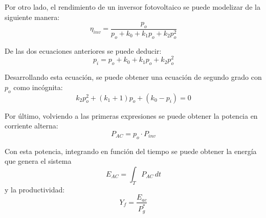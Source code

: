 Por otro lado, el rendimiento de un inversor fotovoltaico se puede modelizar de la siguiente manera:
\begin{equation}
\eta_{inv}=\frac{p_o}{p_o+k_0+k_1p_o+k_2p_o^2}
\end{equation}

De las dos ecuaciones anteriores se puede deducir:
\begin{equation}
p_i=p_o+k_0+k_1p_o+k_2p_o^2
\end{equation}

Desarrollando esta ecuación, se puede obtener una ecuación de segundo grado con \(p_o\) como incógnita:
\begin{equation}
k_2p_o^2+(k_1+1)p_o+(k_0-p_i)=0
\end{equation}

Por último, volviendo a las primeras expresiones se puede obtener la potencia en corriente alterna:
\begin{equation}
P_{AC}=p_o\cdot P_{inv}
\end{equation}

Con esta potencia, integrando en función del tiempo se puede obtener la energía que genera el sistema
\begin{equation}
E_{AC}=\int_{T} P_{AC} \,dt
\end{equation}
y la productividad:
\begin{equation}
Y_f=\frac{E_{ac}}{P_g^*}
\end{equation}

